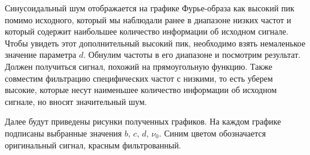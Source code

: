\documentclass[a4paper, 12pt]{article}
\begin{document}
    Синусоидальный шум отображается на графике Фурье-образа как высокий пик помимо исходного, который мы наблюдали ранее в диапазоне низких частот
    и который содержит наибольшее количество информации об исходном сигнале. Чтобы увидеть этот дополнительный высокий пик, необходимо взять немаленькое значение параметра $d$.
    Обнулим частоты в его диапазоне и посмотрим результат. Должен
    получиться сигнал, похожий на прямоугольную функцию. Также совместим фильтрацию специфических частот с низкими, то есть уберем высокие, которые
    несут наименьшее количество информации об исходном сигнале, но вносят значительный шум.


    Далее будут приведены рисунки полученных графиков. На каждом графике подписаны выбранные значения $b,\,c,\,d,\,\nu_0$. 
    Синим цветом обозначается оригинальный сигнал, красным фильтрованный. 
\end{document}
